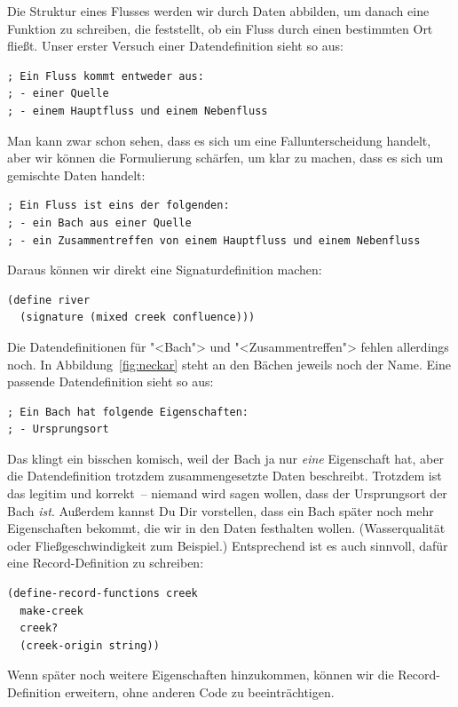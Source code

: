 Die Struktur eines Flusses werden wir durch Daten abbilden, um danach
eine Funktion zu schreiben, die feststellt, ob ein Fluss durch einen
bestimmten Ort fließt.  Unser erster Versuch einer Datendefinition
sieht so aus:
%
\begin{lstlisting}
; Ein Fluss kommt entweder aus:
; - einer Quelle
; - einem Hauptfluss und einem Nebenfluss
\end{lstlisting}
%
Man kann zwar schon sehen, dass es sich um eine Fallunterscheidung
handelt, aber wir können die Formulierung schärfen, um klar zu machen,
dass es sich um gemischte Daten handelt:
%
\begin{lstlisting}
; Ein Fluss ist eins der folgenden:
; - ein Bach aus einer Quelle
; - ein Zusammentreffen von einem Hauptfluss und einem Nebenfluss
\end{lstlisting}
%
Daraus können wir direkt eine Signaturdefinition machen:
%
\begin{lstlisting}
(define river
  (signature (mixed creek confluence)))
\end{lstlisting}
%
Die Datendefinitionen für "<Bach"> und "<Zusammentreffen"> fehlen
allerdings noch.  In Abbildung~\ref{fig:neckar} steht an den Bächen
jeweils noch der Name.  Eine passende Datendefinition sieht so aus:
%
\begin{lstlisting}
; Ein Bach hat folgende Eigenschaften:
; - Ursprungsort
\end{lstlisting}
%
Das klingt ein bisschen komisch, weil der Bach ja nur \emph{eine}
Eigenschaft hat, aber die Datendefinition trotzdem zusammengesetzte
Daten beschreibt.  Trotzdem ist das legitim und korrekt~-- niemand
wird sagen wollen, dass der Ursprungsort der Bach \emph{ist}.
Außerdem kannst Du Dir vorstellen, dass ein Bach später noch mehr
Eigenschaften bekommt, die wir in den Daten festhalten
wollen. (Wasserqualität oder Fließgeschwindigkeit zum Beispiel.)
Entsprechend ist es auch sinnvoll, dafür eine Record-Definition zu
schreiben:
%
\begin{lstlisting}
(define-record-functions creek
  make-creek
  creek?
  (creek-origin string))
\end{lstlisting}
%
Wenn später noch weitere Eigenschaften hinzukommen, können wir die
Record-Definition erweitern, ohne anderen Code zu beeinträchtigen.

